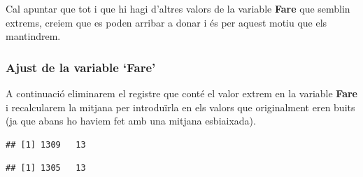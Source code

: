 \documentclass[
]{article}
\newenvironment{Shaded}{\begin{snugshade}}{\end{snugshade}}
\newcommand{\CommentTok}[1]{\textcolor[rgb]{0.50,0.62,0.50}{#1}}
\newcommand{\FunctionTok}[1]{\textcolor[rgb]{0.94,0.94,0.56}{#1}}
\newcommand{\NormalTok}[1]{\textcolor[rgb]{0.80,0.80,0.80}{#1}}
\newcommand{\OtherTok}[1]{\textcolor[rgb]{0.94,0.94,0.56}{#1}}
\newcommand{\SpecialCharTok}[1]{\textcolor[rgb]{0.86,0.64,0.64}{#1}}
\begin{document}
Cal apuntar que tot i que hi hagi d'altres valors de la variable
\textbf{Fare} que semblin extrems, creiem que es poden arribar a donar i
és per aquest motiu que els mantindrem.

\hypertarget{ajust-de-la-variable-fare}{%
\subsubsection{Ajust de la variable
`Fare'}\label{ajust-de-la-variable-fare}}

A continuació eliminarem el registre que conté el valor extrem en la
variable \textbf{Fare} i recalcularem la mitjana per introduïrla en els
valors que originalment eren buits (ja que abans ho haviem fet amb una
mitjana esbiaixada).

\begin{Shaded}
\end{Shaded}

\begin{verbatim}
## [1] 1309   13
\end{verbatim}

\begin{Shaded}
\end{Shaded}

\begin{verbatim}
## [1] 1305   13
\end{verbatim}

\begin{Shaded}
\end{Shaded}
\end{document}

